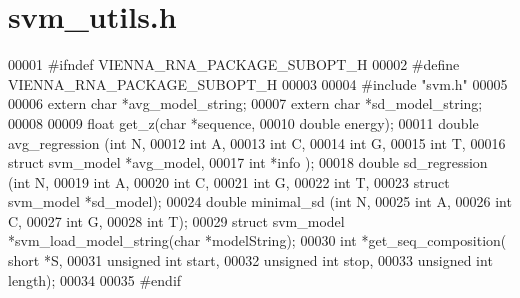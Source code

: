 \hypertarget{svm__utils_8h_source}{}\section{svm\+\_\+utils.\+h}
\label{svm__utils_8h_source}

\begin{DoxyCode}
00001 \textcolor{preprocessor}{#ifndef VIENNA\_RNA\_PACKAGE\_SUBOPT\_H}
00002 \textcolor{preprocessor}{#define VIENNA\_RNA\_PACKAGE\_SUBOPT\_H}
00003 
00004 \textcolor{preprocessor}{#include "svm.h"}
00005 
00006 \textcolor{keyword}{extern}  \textcolor{keywordtype}{char} *avg\_model\_string;
00007 \textcolor{keyword}{extern}  \textcolor{keywordtype}{char} *sd\_model\_string;
00008 
00009 \textcolor{keywordtype}{float}     get\_z(\textcolor{keywordtype}{char} *sequence,
00010                 \textcolor{keywordtype}{double} energy);
00011 \textcolor{keywordtype}{double}    avg\_regression (\textcolor{keywordtype}{int} N,
00012                           \textcolor{keywordtype}{int} A,
00013                           \textcolor{keywordtype}{int} C,
00014                           \textcolor{keywordtype}{int} G,
00015                           \textcolor{keywordtype}{int} T,
00016                           \textcolor{keyword}{struct} svm\_model *avg\_model,
00017                           \textcolor{keywordtype}{int} *info );
00018 \textcolor{keywordtype}{double}    sd\_regression  (\textcolor{keywordtype}{int} N,
00019                           \textcolor{keywordtype}{int} A,
00020                           \textcolor{keywordtype}{int} C,
00021                           \textcolor{keywordtype}{int} G,
00022                           \textcolor{keywordtype}{int} T,
00023                           \textcolor{keyword}{struct} svm\_model  *sd\_model);
00024 \textcolor{keywordtype}{double}    minimal\_sd     (\textcolor{keywordtype}{int} N,
00025                           \textcolor{keywordtype}{int} A,
00026                           \textcolor{keywordtype}{int} C,
00027                           \textcolor{keywordtype}{int} G,
00028                           \textcolor{keywordtype}{int} T);
00029 \textcolor{keyword}{struct }svm\_model *svm\_load\_model\_string(\textcolor{keywordtype}{char} *modelString);
00030 \textcolor{keywordtype}{int}       *get\_seq\_composition( \textcolor{keywordtype}{short} *S,
00031                                 \textcolor{keywordtype}{unsigned} \textcolor{keywordtype}{int} start,
00032                                 \textcolor{keywordtype}{unsigned} \textcolor{keywordtype}{int} stop,
00033                                 \textcolor{keywordtype}{unsigned} \textcolor{keywordtype}{int} length);
00034 
00035 \textcolor{preprocessor}{#endif}
\end{DoxyCode}
